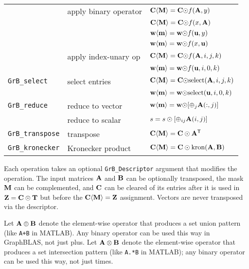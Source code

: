 \documentclass[12pt]{article}
\begin{document}
{\begin{tabular}{lll}
                     & apply binary operator   & ${\bf C \langle M \rangle = C \odot} f({\bf A},y)$ \\
                     &                         & ${\bf C \langle M \rangle = C \odot} f(x,{\bf A})$ \\
                     &                         & ${\bf w \langle m \rangle = w \odot} f({\bf u},y)$ \\
                     &                         & ${\bf w \langle m \rangle = w \odot} f(x,{\bf u})$ \\
                     & apply index-unary op    & ${\bf C \langle M \rangle = C \odot} f({\bf A},i,j,k)$ \\
                     &                         & ${\bf w \langle m \rangle = w \odot} f({\bf u},i,0,k)$ \\
\hline
\verb'GrB_select'    & select entries          & ${\bf C \langle M \rangle = C \odot} \mbox{select}({\bf A},i,j,k)$ \\
                     &                         & ${\bf w \langle m \rangle = w \odot} \mbox{select}({\bf u},i,0,k)$ \\
\hline
\verb'GrB_reduce'    & reduce to vector        & ${\bf w \langle m \rangle = w \odot} [{\oplus}_j {\bf A}(:,j)]$ \\
                     & reduce to scalar        & $s = s \odot [{\oplus}_{ij}  {\bf A}(i,j)]$ \\
\hline
\verb'GrB_transpose' & transpose               & ${\bf C \langle M \rangle = C \odot A^{\sf T}}$ \\
\hline
\verb'GrB_kronecker' & Kronecker product       & ${\bf C \langle M \rangle = C \odot \mbox{kron}(A, B)}$ \\
\hline
\end{tabular}
}
\vspace{0.15in}

Each operation takes an optional \verb'GrB_Descriptor' argument that modifies
the operation.  The input matrices ${\bf A}$ and ${\bf B}$ can be optionally
transposed, the mask ${\bf M}$ can be complemented, and ${\bf C}$ can be
cleared of its entries after it is used in ${\bf Z = C \odot T}$ but before
the ${\bf C \langle M \rangle = Z}$ assignment.
Vectors are never transposed via the descriptor.

Let ${\bf A \oplus B}$ denote the element-wise operator that produces a set
union pattern (like \verb'A+B' in MATLAB).  Any binary operator can be used
this way in GraphBLAS, not just plus.  Let ${\bf A \otimes B}$ denote the
element-wise operator that produces a set intersection pattern (like
\verb'A.*B' in MATLAB); any binary operator can be used this way, not just
times.
\end{document}
